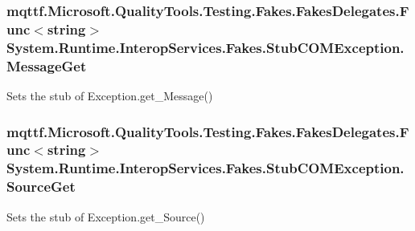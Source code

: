 \hypertarget{class_system_1_1_runtime_1_1_interop_services_1_1_fakes_1_1_stub_c_o_m_exception_a2b21eac62220f1e290ea172a08cc12e5}{
\subsubsection[{Message\-Get}]{\setlength{\rightskip}{0pt plus 5cm}mqttf.\-Microsoft.\-Quality\-Tools.\-Testing.\-Fakes.\-Fakes\-Delegates.\-Func$<$string$>$ System.\-Runtime.\-Interop\-Services.\-Fakes.\-Stub\-C\-O\-M\-Exception.\-Message\-Get}}\label{class_system_1_1_runtime_1_1_interop_services_1_1_fakes_1_1_stub_c_o_m_exception_a2b21eac62220f1e290ea172a08cc12e5}


Sets the stub of Exception.\-get\-\_\-\-Message()

\hypertarget{class_system_1_1_runtime_1_1_interop_services_1_1_fakes_1_1_stub_c_o_m_exception_af37071c29dfc879729dd82db3869c518}{
\subsubsection[{Source\-Get}]{\setlength{\rightskip}{0pt plus 5cm}mqttf.\-Microsoft.\-Quality\-Tools.\-Testing.\-Fakes.\-Fakes\-Delegates.\-Func$<$string$>$ System.\-Runtime.\-Interop\-Services.\-Fakes.\-Stub\-C\-O\-M\-Exception.\-Source\-Get}}\label{class_system_1_1_runtime_1_1_interop_services_1_1_fakes_1_1_stub_c_o_m_exception_af37071c29dfc879729dd82db3869c518}


Sets the stub of Exception.\-get\-\_\-\-Source()

